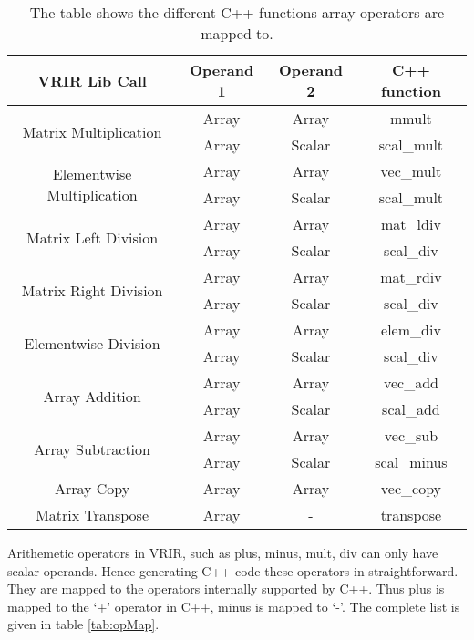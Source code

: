 					\begin{table}[htbp]
					\centering
					\begin{tabular}{|c|c|c|c|}
					\hline
					VRIR Lib Call                               & Operand 1 & Operand 2 & C++ function \\ \hline
					\multirow{2}{*}{Matrix Multiplication}      & Array     & Array     & mmult        \\ \cline{2-4} 
					& Array     & Scalar    & scal\_mult   \\ \hline
					\multirow{2}{*}{Elementwise Multiplication} & Array     & Array     & vec\_mult    \\ \cline{2-4} 
					& Array     & Scalar    & scal\_mult   \\ \hline
					\multirow{2}{*}{Matrix Left Division}       & Array     & Array     & mat\_ldiv    \\ \cline{2-4} 
					& Array     & Scalar    & scal\_div    \\ \hline
					\multirow{2}{*}{Matrix Right Division}      & Array     & Array     & mat\_rdiv    \\ \cline{2-4} 
					& Array     & Scalar    & scal\_div    \\ \hline
					\multirow{2}{*}{Elementwise Division}       & Array     & Array     & elem\_div    \\ \cline{2-4} 
					& Array     & Scalar    & scal\_div    \\ \hline
					\multirow{2}{*}{Array Addition}             & Array     & Array     & vec\_add     \\ \cline{2-4} 
					& Array     & Scalar    & scal\_add    \\ \hline
					\multirow{2}{*}{Array Subtraction}          & Array     & Array     & vec\_sub     \\ \cline{2-4} 
					& Array     & Scalar    & scal\_minus  \\ \hline
					Array Copy                                  & Array     & Array     & vec\_copy    \\ \hline
					Matrix Transpose                            & Array     & -         & transpose    \\ \hline
					\end{tabular}
					\caption[List of operations on Arrays]{The table shows the different C++ functions array operators are mapped to. }
					\label{tab:arrayOpMap}
					\end{table}
Arithemetic operators in VRIR, such as plus, minus, mult, div can only have scalar operands. Hence generating C++ code these operators in straightforward. They are mapped to the operators internally supported by C++. Thus plus is mapped to the `+' operator in C++, minus is mapped to `-'. The complete list is given in table \ref{tab:opMap}. \\

